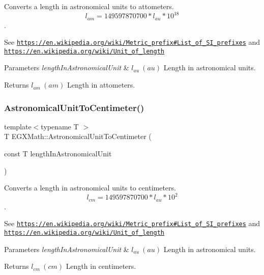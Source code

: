 Converts a length in astronomical units to attometers. \[ l_{am}=149597870700 * l_{au} * 10^{18} \]. 

See \href{https://en.wikipedia.org/wiki/Metric_prefix#List_of_SI_prefixes}{\tt https\+://en.\+wikipedia.\+org/wiki/\+Metric\+\_\+prefix\#\+List\+\_\+of\+\_\+\+S\+I\+\_\+prefixes} and \href{https://en.wikipedia.org/wiki/Unit_of_length}{\tt https\+://en.\+wikipedia.\+org/wiki/\+Unit\+\_\+of\+\_\+length} 
\begin{DoxyParams}{Parameters}
{\em length\+In\+Astronomical\+Unit} & $ l_{au}\ (au)$ Length in astronomical units. \\
\hline
\end{DoxyParams}
\begin{DoxyReturn}{Returns}
$ l_{am}\ (am)$ Length in attometers. 
\end{DoxyReturn}
\mbox{\label{group___e_g_x_math-_conversions-_length_conversions-_astronomical-_astronomical_unit-_s_i_ga0d73749583f37bdf64ebe5cace907212}} 
\subsubsection{\texorpdfstring{Astronomical\+Unit\+To\+Centimeter()}{AstronomicalUnitToCentimeter()}}
{\footnotesize\ttfamily template$<$typename T $>$ \\
T E\+G\+X\+Math\+::\+Astronomical\+Unit\+To\+Centimeter (\begin{DoxyParamCaption}\item[{const T}]{length\+In\+Astronomical\+Unit }\end{DoxyParamCaption})}



Converts a length in astronomical units to centimeters. \[ l_{cm}=149597870700 * l_{au} * 10^{2} \]. 

See \href{https://en.wikipedia.org/wiki/Metric_prefix#List_of_SI_prefixes}{\tt https\+://en.\+wikipedia.\+org/wiki/\+Metric\+\_\+prefix\#\+List\+\_\+of\+\_\+\+S\+I\+\_\+prefixes} and \href{https://en.wikipedia.org/wiki/Unit_of_length}{\tt https\+://en.\+wikipedia.\+org/wiki/\+Unit\+\_\+of\+\_\+length} 
\begin{DoxyParams}{Parameters}
{\em length\+In\+Astronomical\+Unit} & $ l_{au}\ (au)$ Length in astronomical units. \\
\hline
\end{DoxyParams}
\begin{DoxyReturn}{Returns}
$ l_{cm}\ (cm)$ Length in centimeters. 
\end{DoxyReturn}
\mbox{\label{group___e_g_x_math-_conversions-_length_conversions-_astronomical-_astronomical_unit-_s_i_gac8f9ac32051072ffda0b6e832c33cc7f}} 
